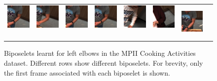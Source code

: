 \documentclass[runningheads]{llncs}
\begin{document}
\begin{figure}[t]
\begin{center}
\begin{tabular}{@{}c@{}c@{}c@{}c@{}c@{}c@{}c@{}c@{}}
%
\includegraphics[height=0.1375\linewidth]{figures/biposelets/poselet-297/sample-1-f0.jpg}\,&
\includegraphics[height=0.1375\linewidth]{figures/biposelets/poselet-297/sample-2-f0.jpg}\,&
\includegraphics[height=0.1375\linewidth]{figures/biposelets/poselet-297/sample-3-f0.jpg}\,&
\includegraphics[height=0.1375\linewidth]{figures/biposelets/poselet-297/sample-4-f0.jpg}\,&
\includegraphics[height=0.1375\linewidth]{figures/biposelets/poselet-297/sample-5-f0.jpg}\,&
\includegraphics[height=0.1375\linewidth]{figures/biposelets/poselet-297/sample-6-f0.jpg}\,&
\includegraphics[height=0.1375\linewidth]{figures/biposelets/poselet-297/sample-7-f0.jpg}\\
\end{tabular}
\end{center}
\caption{Biposelets learnt for left elbows in the MPII Cooking Activities
dataset. Different rows show different biposelets. For brevity,
only the first frame associated with each biposelet is shown.}
\label{fig:biposelets}
\end{figure}
\end{document}

